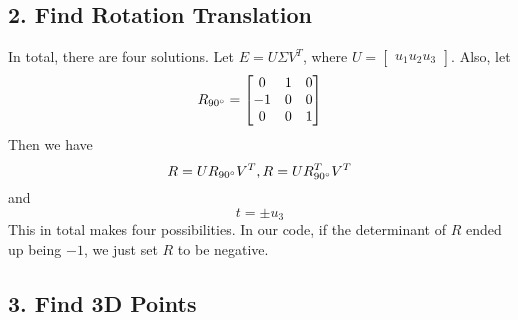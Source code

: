 \documentclass{article}\usepackage{amsmath,amssymb,amsthm,tikz,tkz-graph,color,chngpage,soul,hyperref,csquotes,graphicx,floatrow}\newcommand*{\QEDB}{\hfill\ensuremath{\square}}\newtheorem*{prop}{Proposition}\renewcommand{\theenumi}{\alph{enumi}}\usepackage[shortlabels]{enumitem}\usepackage[nobreak=true]{mdframed}\usetikzlibrary{matrix,calc}\MakeOuterQuote{"}\usepackage[margin=0.95in]{geometry} \newtheorem{theorem}{Theorem}
\begin{document}
\subsection*{2. Find Rotation Translation}
\begin{mdframed}
In total, there are four solutions. Let $ E = U \Sigma V^T$, where $ U =\begin{bmatrix} u_1 u_2 u_3 \end{bmatrix} $. Also, let 
\[ R_{90\degree} =  
\begin{bmatrix}
 0 & 1 & 0 \\
 -1 & 0 & 0 \\
 0 & 0 & 1 \\
\end{bmatrix}
\]
Then we have \[ R = UR_{90\degree}V^T, R = UR_{90\degree}^T V^T \] and \[ t = \pm u_3 \] This in total makes four possibilities. In our code, if the determinant of $ R $ ended up being $ -1 $, we just set $ R $ to be negative.

\end{mdframed}

\subsection*{3. Find 3D Points}
\begin{mdframed}


\end{mdframed}
\end{document}
